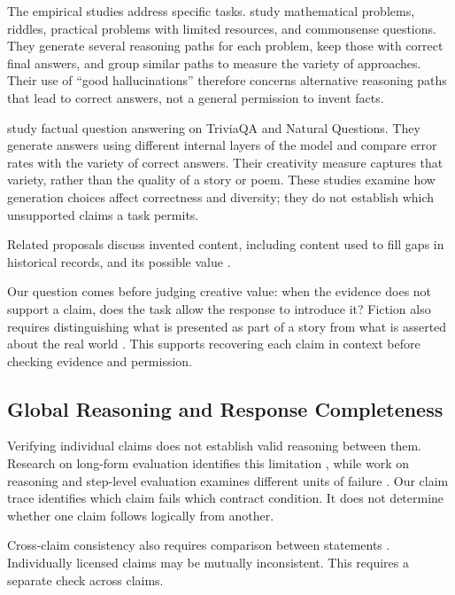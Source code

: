 \documentclass{clv2025}
\begin{document}
The empirical studies address specific tasks. \citet{sun_hallucinating_2024}
study mathematical problems, riddles, practical problems with limited
resources, and commonsense questions. They generate several reasoning paths
for each problem, keep those with correct final answers, and group similar
paths to measure the variety of approaches. Their use of ``good
hallucinations'' therefore concerns alternative reasoning paths that lead
to correct answers, not a general permission to invent facts.

\citet{he_shakespearean_2025} study factual question answering on TriviaQA
and Natural Questions. They generate answers using different internal
layers of the model and compare error rates with the variety of correct
answers. Their creativity measure captures that variety, rather than the
quality of a story or poem. These studies examine how generation choices
affect correctness and diversity; they do not establish which unsupported
claims a task permits.

Related proposals discuss invented content, including content used to fill
gaps in historical records, and its possible value
\citep{sui_confabulation_2024,sui_critical_2025,yang_hicbench_2025}.

Our question comes before judging creative value: when the evidence does not
support a claim, does the task allow the response to introduce it? Fiction
also requires distinguishing what is presented as part of a story from what
is asserted about the real world \citep{searle_logical_1975}. This supports
recovering each claim in context before checking evidence and permission.

\subsection{Global Reasoning and Response Completeness}\label{subsec:global}

Verifying individual claims does not establish valid reasoning between them.
Research on long-form evaluation identifies this limitation
\citep{yan_logicscore_2026}, while work on reasoning and step-level evaluation
examines different units of failure
\citep{arcuschin_cot_2025,pham_grace_2026}.
Our claim trace identifies which claim fails which contract condition. It
does not determine whether one claim follows logically from another.

Cross-claim consistency also requires comparison between statements
\citep{mundler_selfcontradictory_2024}. Individually licensed claims may be
mutually inconsistent. This requires a separate check across claims.
\end{document}
